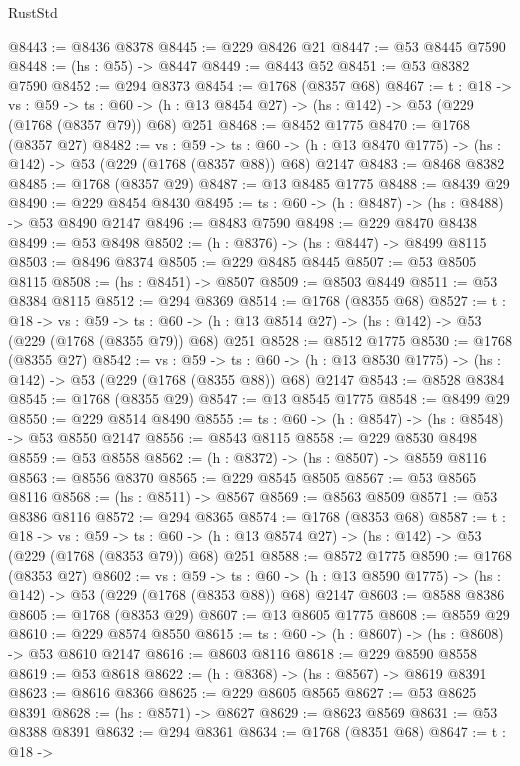 \begin{lexlean}{RustStd}
\begin{coremodule}
@8443 := @8436 @8378
@8445 := @229 @8426 @21
@8447 := @53 @8445 @7590
@8448 := (hs : @55) -> @8447
@8449 := @8443 @52
@8451 := @53 @8382 @7590
@8452 := @294 @8373
@8454 := @1768 (@8357 @68)
@8467 := {t : @18} ->
  {vs : @59} ->
  {ts : @60} -> (h : @13 @8454 @27) -> (hs : @142) -> @53 (@229 (@1768 (@8357 @79)) @68) @251
@8468 := @8452 @1775
@8470 := @1768 (@8357 @27)
@8482 := {vs : @59} ->
  {ts : @60} -> (h : @13 @8470 @1775) -> (hs : @142) -> @53 (@229 (@1768 (@8357 @88)) @68) @2147
@8483 := @8468 @8382
@8485 := @1768 (@8357 @29)
@8487 := @13 @8485 @1775
@8488 := @8439 @29
@8490 := @229 @8454 @8430
@8495 := {ts : @60} -> (h : @8487) -> (hs : @8488) -> @53 @8490 @2147
@8496 := @8483 @7590
@8498 := @229 @8470 @8438
@8499 := @53 @8498
@8502 := (h : @8376) -> (hs : @8447) -> @8499 @8115
@8503 := @8496 @8374
@8505 := @229 @8485 @8445
@8507 := @53 @8505 @8115
@8508 := (hs : @8451) -> @8507
@8509 := @8503 @8449
@8511 := @53 @8384 @8115
@8512 := @294 @8369
@8514 := @1768 (@8355 @68)
@8527 := {t : @18} ->
  {vs : @59} ->
  {ts : @60} -> (h : @13 @8514 @27) -> (hs : @142) -> @53 (@229 (@1768 (@8355 @79)) @68) @251
@8528 := @8512 @1775
@8530 := @1768 (@8355 @27)
@8542 := {vs : @59} ->
  {ts : @60} -> (h : @13 @8530 @1775) -> (hs : @142) -> @53 (@229 (@1768 (@8355 @88)) @68) @2147
@8543 := @8528 @8384
@8545 := @1768 (@8355 @29)
@8547 := @13 @8545 @1775
@8548 := @8499 @29
@8550 := @229 @8514 @8490
@8555 := {ts : @60} -> (h : @8547) -> (hs : @8548) -> @53 @8550 @2147
@8556 := @8543 @8115
@8558 := @229 @8530 @8498
@8559 := @53 @8558
@8562 := (h : @8372) -> (hs : @8507) -> @8559 @8116
@8563 := @8556 @8370
@8565 := @229 @8545 @8505
@8567 := @53 @8565 @8116
@8568 := (hs : @8511) -> @8567
@8569 := @8563 @8509
@8571 := @53 @8386 @8116
@8572 := @294 @8365
@8574 := @1768 (@8353 @68)
@8587 := {t : @18} ->
  {vs : @59} ->
  {ts : @60} -> (h : @13 @8574 @27) -> (hs : @142) -> @53 (@229 (@1768 (@8353 @79)) @68) @251
@8588 := @8572 @1775
@8590 := @1768 (@8353 @27)
@8602 := {vs : @59} ->
  {ts : @60} -> (h : @13 @8590 @1775) -> (hs : @142) -> @53 (@229 (@1768 (@8353 @88)) @68) @2147
@8603 := @8588 @8386
@8605 := @1768 (@8353 @29)
@8607 := @13 @8605 @1775
@8608 := @8559 @29
@8610 := @229 @8574 @8550
@8615 := {ts : @60} -> (h : @8607) -> (hs : @8608) -> @53 @8610 @2147
@8616 := @8603 @8116
@8618 := @229 @8590 @8558
@8619 := @53 @8618
@8622 := (h : @8368) -> (hs : @8567) -> @8619 @8391
@8623 := @8616 @8366
@8625 := @229 @8605 @8565
@8627 := @53 @8625 @8391
@8628 := (hs : @8571) -> @8627
@8629 := @8623 @8569
@8631 := @53 @8388 @8391
@8632 := @294 @8361
@8634 := @1768 (@8351 @68)
@8647 := {t : @18} ->

\end{coremodule}
\end{lexlean}
